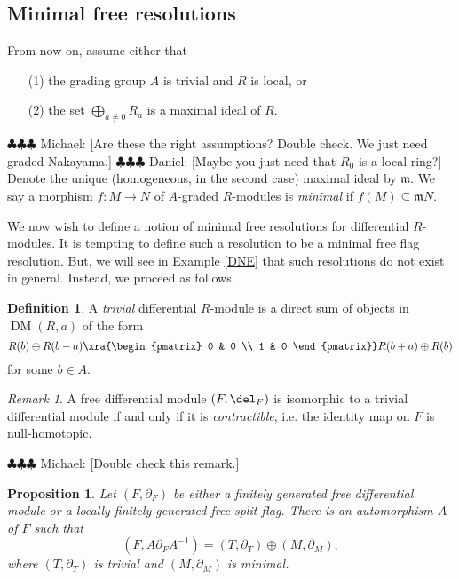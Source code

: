 \documentclass[12pt]{amsart}
\newtheorem{prop}[lemma]{Proposition}
\theoremstyle{definition}
\newtheorem{defn}[lemma]{Definition}
\theoremstyle{remark}
\newtheorem{rem}[lemma]{Remark}
\newcommand{\m}{\mathfrak m}
\newcommand{\daniel}[1]{{\color{blue} \sf $\clubsuit\clubsuit\clubsuit$ Daniel: [#1]}}
\newcommand{\michael}[1]{{\color{red} \sf $\clubsuit\clubsuit\clubsuit$ Michael: [#1]}}
\def\DM{\operatorname{DM}}
\begin{document}
\subsection{Minimal free resolutions}

From now on, assume either that
\begin{itemize}
\item[(1)] the grading group $A$ is trivial and $R$ is local, or
\item[(2)] the set $\bigoplus_{a \ne 0} R_a$ is a maximal ideal of $R$.
\end{itemize}
\michael{Are these the right assumptions? Double check. We just need graded Nakayama.}\daniel{Maybe you just need that $R_0$ is a local ring?}
Denote the unique (homogeneous, in the second case) maximal ideal by $\m$. We say a morphism $f : M \to N$ of $A$-graded $R$-modules is \emph{minimal} if $f(M) \subseteq \m N$.

We now wish to define a notion of minimal free resolutions for differential $R$-modules. It is tempting to define such a resolution to be a minimal free flag resolution. But, we will see in Example \ref{DNE} that such resolutions do not exist in general. Instead, we proceed as follows. 

\begin{defn}
A \emph{trivial} differential $R$-module is a direct sum of objects in $\DM(R, a)$ of the form
$$
R(b) \oplus R(b-a) \xra{\begin{pmatrix} 0 & 0 \\ 1 & 0 \end{pmatrix}} R(b+a) \oplus R(b)
$$
for some $b \in A $.
\end{defn}

\begin{rem}
A free differential module $(F, \del_F)$ is isomorphic to a trivial differential module if and only if it is \emph{contractible}, i.e. the identity map on $F$ is null-homotopic. 
\end{rem}
\michael{Double check this remark.}


\begin{prop}
\label{decomp}
Let $(F, \partial_F)$ be either a finitely generated free differential module or a locally finitely generated free split flag. There is an automorphism $A$ of $F$ such that
$$
(F, A\partial_FA^{-1}) =  (T, \partial_T) \oplus (M, \partial_M),
$$
where $(T, \partial_T)$ is trivial and $(M, \partial_M)$ is minimal.
\end{prop}
\end{document}
